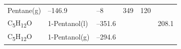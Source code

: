 \documentclass[
  9pt,
]{extbook}
\theoremstyle{definition}
\theoremstyle{definition}
\theoremstyle{definition}
\theoremstyle{remark}
\begin{document}
\begin{longtable}[]{@{}llllll@{}}
\begin{minipage}[t]{0.17\columnwidth}
Pentane(g)\strut
\end{minipage} & \begin{minipage}[t]{0.15\columnwidth}\raggedright
--146.9\strut
\end{minipage} & \begin{minipage}[t]{0.15\columnwidth}\raggedright
--8\strut
\end{minipage} & \begin{minipage}[t]{0.14\columnwidth}\raggedright
349\strut
\end{minipage} & \begin{minipage}[t]{0.14\columnwidth}\raggedright
120\strut
\end{minipage}\tabularnewline
\begin{minipage}[t]{0.07\columnwidth}\raggedright
C\textsubscript{5}H\textsubscript{12}O\strut
\end{minipage} & \begin{minipage}[t]{0.17\columnwidth}\raggedright
1-Pentanol(l)\strut
\end{minipage} & \begin{minipage}[t]{0.15\columnwidth}\raggedright
--351.6\strut
\end{minipage} & \begin{minipage}[t]{0.15\columnwidth}\raggedright
\strut
\end{minipage} & \begin{minipage}[t]{0.14\columnwidth}\raggedright
\strut
\end{minipage} & \begin{minipage}[t]{0.14\columnwidth}\raggedright
208.1\strut
\end{minipage}\tabularnewline
\begin{minipage}[t]{0.07\columnwidth}\raggedright
C\textsubscript{5}H\textsubscript{12}O\strut
\end{minipage} & \begin{minipage}[t]{0.17\columnwidth}\raggedright
1-Pentanol(g)\strut
\end{minipage} & \begin{minipage}[t]{0.15\columnwidth}\raggedright
--294.6\strut
\end{minipage} & \begin{minipage}[t]{0.15\columnwidth}\raggedright
\strut
\end{minipage} & \begin{minipage}[t]{0.14\columnwidth}\raggedright
\strut
\end{minipage} & \begin{minipage}[t]{0.14\columnwidth}\raggedright

\end{minipage}
\end{longtable}
\end{document}

